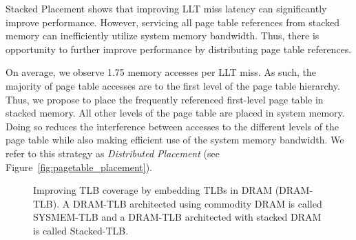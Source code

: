 \noindent Stacked Placement shows that improving LLT miss latency can
significantly improve performance. However, servicing all page table
references from stacked memory can inefficiently utilize system memory
bandwidth. Thus, there is opportunity to further improve performance
by distributing page table references.


On average, we observe 1.75 memory accesses per LLT miss. As such, the
majority of page table accesses are to the first level of the page
table hierarchy. Thus, we propose to place the frequently referenced
first-level page table in stacked memory. All other levels of the page
table are placed in system memory. Doing so reduces the interference
between accesses to the different levels of the page table while also
making efficient use of the system memory bandwidth. We refer to this
strategy as {\em Distributed Placement} (see
Figure~\ref{fig:pagetable_placement}).

\begin{figure*}[t] 
  \vspace{-0. in} \centering
   \centerline{}

  \caption{\small Improving TLB coverage by embedding TLBs in DRAM
    (DRAM-TLB). A DRAM-TLB architected using commodity DRAM is called
    SYSMEM-TLB and a DRAM-TLB architected with stacked DRAM is called
    Stacked-TLB. \normalsize}
  \label{fig:stacked_tlb} 
  \vspace{-0. in}
\end{figure*}



